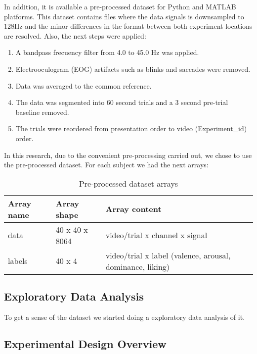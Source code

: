 \documentclass{sig-alternate}
\begin{document}
In addition, it is available a pre-processed dataset for Python and MATLAB platforms. This dataset contains files where the data signals is downsampled to 128Hz and the minor differences in the format between both experiment locations are resolved. Also, the next steps were applied:
\begin{enumerate}
\item A bandpass frecuency filter from 4.0 to 45.0 Hz was applied.
\item Electrooculogram (EOG) artifacts such as blinks and saccades were removed.
\item Data was averaged to the common reference.
\item The data was segmented into 60 second trials and a 3 second pre-trial baseline removed.
\item The trials were reordered from presentation order to video (Experiment\_id) order.
\end{enumerate} 

In this research, due to the convenient pre-processing carried out, we chose to use the pre-processed dataset. For each subject we had the next arrays:

\begin{table}[h!]
\footnotesize
\begin{center}
\begin{tabular}{|p{1cm}|p{2cm}|p{4.5cm}|}
      	\hline 
      	Array name & Array shape & Array content \\ 
      	\hline 
      	data & 40 x 40 x 8064 & video/trial x channel x signal \\ 
      	\hline
      	labels & 40 x 4 & video/trial x label (valence, arousal, dominance, liking) \\ 
      	\hline 
\end{tabular} 
\end{center}
\caption{Pre-processed dataset arrays}
\label{tab:dataset}
\end{table}       	
	
\subsection{Exploratory Data Analysis}

To get a sense of the dataset we started doing a exploratory data analysis of it. 	
	
	\subsection{Experimental Design Overview}
\end{document}
